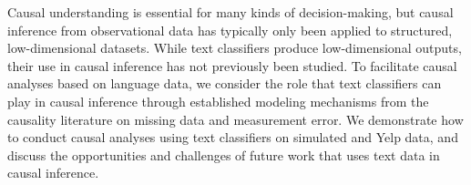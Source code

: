 Causal understanding is essential for many kinds of decision-making, but causal inference from observational data has typically only been applied to structured, low-dimensional datasets. While text classifiers produce low-dimensional outputs, their use in causal inference has not previously been studied. To facilitate causal analyses based on language data, we consider the role that text classifiers can play in causal inference through established modeling mechanisms from the causality literature on missing data and measurement error. We demonstrate how to conduct causal analyses using text classifiers on simulated and Yelp data, and discuss the opportunities and challenges of future work that uses text data in causal inference.
